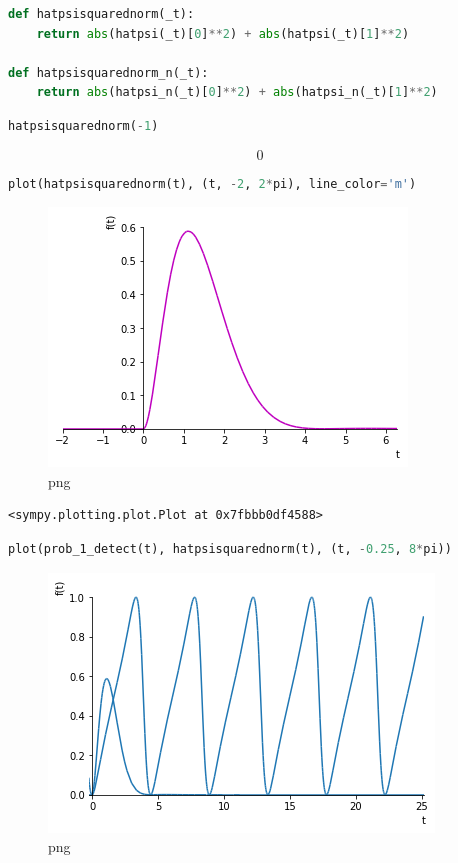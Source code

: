 \begin{lstlisting}[language=Python]
def hatpsisquarednorm(_t):
    return abs(hatpsi(_t)[0]**2) + abs(hatpsi(_t)[1]**2)

def hatpsisquarednorm_n(_t):
    return abs(hatpsi_n(_t)[0]**2) + abs(hatpsi_n(_t)[1]**2)
\end{lstlisting}

\begin{lstlisting}[language=Python]
hatpsisquarednorm(-1)
\end{lstlisting}

\[0\]

\begin{lstlisting}[language=Python]
plot(hatpsisquarednorm(t), (t, -2, 2*pi), line_color='m')
\end{lstlisting}

\begin{figure}
\centering
\includegraphics[width=0.66\linewidth]{output_49_0.png}
\caption[]{png}
\end{figure}

\begin{lstlisting}
<sympy.plotting.plot.Plot at 0x7fbbb0df4588>
\end{lstlisting}

\begin{lstlisting}[language=Python]
plot(prob_1_detect(t), hatpsisquarednorm(t), (t, -0.25, 8*pi))
\end{lstlisting}

\begin{figure}
\centering
\includegraphics[width=0.66\linewidth]{output_50_0.png}
\caption[]{png}
\end{figure}

